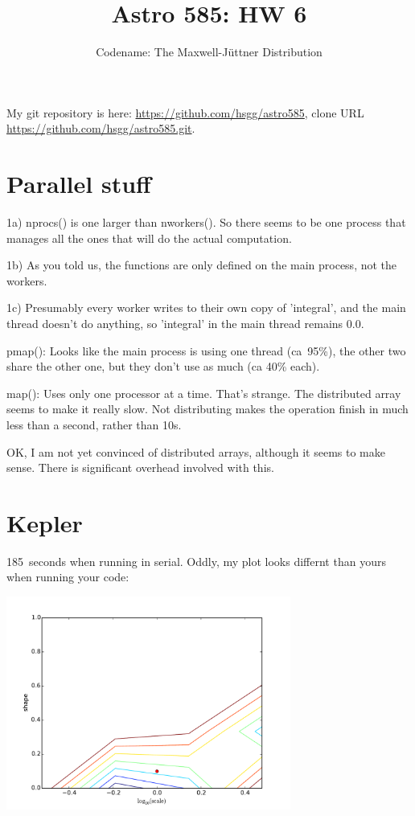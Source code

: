 \documentclass[11pt]{article}
\title{Astro 585: HW 6}
\author{Codename: The Maxwell-Jüttner Distribution}
\begin{document}
\maketitle

My git repository is here: \url{https://github.com/hsgg/astro585}, clone URL
\url{https://github.com/hsgg/astro585.git}.


\section{Parallel stuff}

1a) nprocs() is one larger than nworkers(). So there seems to be one process
that manages all the ones that will do the actual computation.

1b) As you told us, the functions are only defined on the main process, not the
workers.

1c) Presumably every worker writes to their own copy of 'integral', and the
main thread doesn't do anything, so 'integral' in the main thread remains 0.0.

pmap(): Looks like the main process is using one thread (ca~95\%), the other
two share the other one, but they don't use as much (ca 40\% each).

map(): Uses only one processor at a time. That's strange. The distributed array
seems to make it really slow. Not distributing makes the operation finish in
much less than a second, rather than 10s.

OK, I am not yet convinced of distributed arrays, although it seems to make
sense. There is significant overhead involved with this.

\section{Kepler}

185~seconds when running in serial. Oddly, my plot looks differnt than yours
when running your code:
\begin{center}
	\includegraphics[width=0.7\textwidth]{parameterspace_originalserial.pdf}
\end{center}
\end{document}
